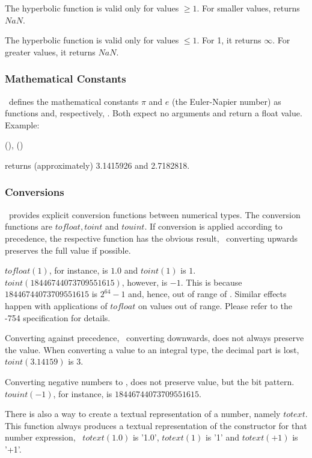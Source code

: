 The hyperbolic function 
is valid only for values $\ge 1$.
For smaller values,  returns $NaN$.

The hyperbolic function 
is valid only for values $\le 1$.
For 1, it returns $\infty$.
For greater values, it returns $NaN$.

\subsubsection{Mathematical Constants}
\nowdb\ defines the mathematical constants
$\pi$ and $e$ (the Euler-Napier number) as
functions  and, respectively, .
Both expect no arguments and return a float value.
Example:

 (), ()
 

returns (approximately)
3.1415926 and
2.7182818.

\subsubsection{Conversions}
\nowdb\ provides explicit conversion functions
between numerical types. The conversion functions
are   
$tofloat, toint$ and $touint$.
If conversion is applied according to precedence,
the respective function has the obvious result,
\ie\ converting upwards preserves the full value
if possible.

$tofloat(1)$, for instance, is $1.0$ and
$toint(1)$ is $1$.
$toint(18446744073709551615)$, however, is $-1$.
This is because $18446744073709551615$ is
$2^{64}-1$ and, hence, out of range of .
Similar effects happen with applications of
$tofloat$ on values out of range.
Please refer to the 
-754 specification for details.

Converting against precedence,
\ie\ converting downwards,
does not always preserve the value.
When converting a 
value to an integral type, the decimal part
is lost, \eg\ $toint(3.14159)$ is 3.

Converting negative numbers to ,
does not preserve value, but the bit pattern.
$touint(-1)$, for instance, is
$18446744073709551615$.

There is also a way to create a textual
representation of a number, namely $totext$.
This function always produces a textual
representation of the constructor for that
number expression,
\eg\ $totext(1.0)$ is '1.0',
$totext(1)$ is '1' and
$totext(+1)$ is '+1'.


